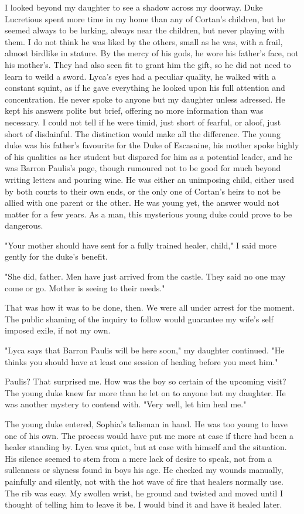 \documentclass{article}
\begin{document}
I looked beyond my daughter to see a shadow across my doorway. Duke Lucretious spent more time in my home than any of Cortan's children, but he seemed always to be lurking, always near the children, but never playing with them. I do not think he was liked by the others, small as he was, with a frail, almost birdlike in stature. By the mercy of his gods, he wore his father's face, not his mother's. They had also seen fit to grant him the gift, so he did not need to learn to weild a sword. Lyca's eyes had a peculiar quality, he walked with a constant squint, as if he gave everything he looked upon his full attention and concentration. He never spoke to anyone but my daughter unless adressed. He kept his answers polite but brief, offering no more information than was necessary. I could not tell if he were timid, just short of fearful, or aloof, just short of disdainful. The distinction would make all the difference. The young duke was his father's favourite for the Duke of Escasaine, his mother spoke highly of his qualities as her student but dispared for him as a potential leader, and he was Barron Paulis's page, though rumoured not to be good for much beyond writing letters and pouring wine. He was either an unimposing child, either used by both courts to their own ends, or the only one of Cortan's heirs to not be allied with one parent or the other. He was young yet, the answer would not matter for a few years. As a man, this mysterious young duke could prove to be dangerous.

"Your mother should have sent for a fully trained healer, child," I said more gently for the duke's benefit.

"She did, father. Men have just arrived from the castle. They said no one may come or go. Mother is seeing to their needs."

That was how it was to be done, then. We were all under arrest for the moment. The public shaming of the inquiry to follow would guarantee my wife's self imposed exile, if not my own.

"Lyca says that Barron Paulis will be here soon," my daughter continued. "He thinks you should have at least one session of healing before you meet him."

Paulis? That surprised me. How was the boy so certain of the upcoming visit? The young duke knew far more than he let on to anyone but my daughter. He was another mystery to contend with. "Very well, let him heal me."

The young duke entered, Sophia's talisman in hand. He was too young to have one of his own. The process would have put me more at ease if there had been a healer standing by. Lyca was quiet, but at ease with himself and the situation. His silence seemed to stem from a mere lack of desire to speak, not from a sullenness or shyness found in boys his age. He checked my wounds manually, painfully and silently, not with the hot wave of fire that healers normally use. The rib was easy. My swollen wrist, he ground and twisted and moved until I thought of telling him to leave it be. I would bind it and have it healed later.
\end{document}
